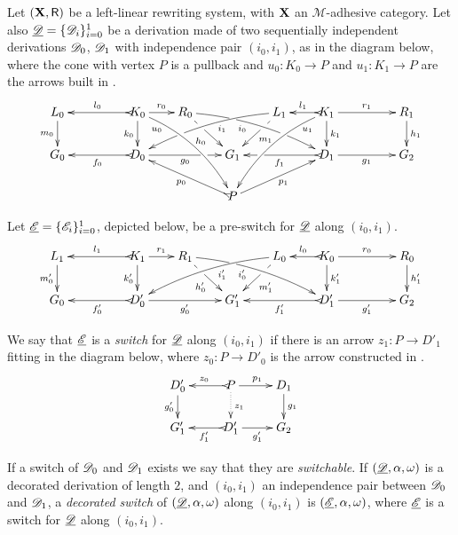 \begin{definition}[Switch] 	Let $(\textbf {\textup{X}}, \mathsf{R})$ be a left-linear rewriting system, with $\textbf {\textup{X}}$ an $\mathcal{M}$-adhesive category.
	Let also $\underline{\mathscr{D}}=\{\mathscr{D}_i\}_{i=0}^1$ be a derivation made
	of two sequentially independent derivations $\mathscr{D}_0$,
	$\mathscr{D}_1$ with independence pair $(i_0, i_1)$, as in the diagram below, where the cone with vertex $P$ is a pullback and $u_0\colon K_0\to P$ and $u_1\colon K_1\to P$ are the arrows built in .
	\[\xymatrix@R=20pt@C=20pt{L_0 \ar[d]_{m_0}&& K_0 \ar @/^.35cm/[ddrr]_(.2){u_0}
		\ar[d]_{k_0}\ar@{>->}[ll]_{l_0} \ar[r]^{r_0} & R_0
		\ar@{>}@/^.25cm/[drrr]|(.32)\hole_(.4){i_0}|(.68)\hole
		\ar[dr]|(.33)\hole_{h_0} && L_1 \ar@{>}@/_.25cm/[dlll]^(.4){i_1}|(.68)\hole 
		\ar[dl]|(.33)\hole^{m_1}& K_1 \ar[d]^{k_1}\ar@{>->}[l]_{l_1} \ar @/_.35cm/[ddll]^(.2){u_1}
		\ar[rr]^{r_1} && R_1 \ar[d]^{h_1}\\G_0 && \ar@{>->}[ll]^{f_0}
		D_0 \ar[rr]_{g_0}|(.7)\hole&& G_1 && \ar@{>->}[ll]^{f_1}|(.7)\hole D_1
		\ar[rr]_{g_1}&& G_2 \\ & & & & P \ar[urr]_{p_1} \ar@{>->}[ull]^{p_0}}
	\]
	
	Let $\underline{\mathscr{E}}=\{\mathscr{E}_i\}_{i=0}^1$, depicted below, be a pre-switch for $\underline{\mathscr{D}}$ along $(i_0,i_1)$.
	\[
	\xymatrix@R=20pt@C=20pt{
		{L_1} \ar[d]_{m_0'}
		&&  {K_1} \ar@{>->}[ll]_{l_1} \ar[r]^{r_1} \ar[d]_{k_0'}
		&  {R_1} \ar[dr]|(.33)\hole_{h_0'}  \ar@/^.25cm/@{>}_(.4){i_0'}|(.32)\hole[drrr]
		& & 
		{L_0}\ar[dl]|(.33)\hole^{m_1'} \ar@/_.25cm/@{>}^(.4){i_1'}[dlll] 
		&  {K_0} \ar@{>->}[l]_{l_0} \ar[rr]^{r_0} \ar[d]^{k_1'}
		& & {R_0} \ar[d]^{h_1'} \\		
		{G_0}
		& & {D_0'} \ar@{>->}[ll]^{f_0'} \ar[rr]_{g_0'}
		& &  {G'_1} 
		& &  {D_1'} \ar@{>->}[ll]^{f_1'} \ar[rr]_{g_1'}
		& & {G_2}  }
	\]
	
	We say that $\underline{\mathscr{E}}$ is a \emph{switch} for $\underline{\mathscr{D}}$ along $(i_0, i_1)$ if there is an arrow $z_1\colon P\to D'_1$ fitting in the diagram below, where $z_0\colon P\to D'_0$ is the arrow constructed in .
	\[\xymatrix@R=18pt{D'_0  \ar[d]_{g'_0}& P \ar[r]^{p_1} \ar@{>->}[l]_{z_0} \ar@{.>}[d]^{z_1} & D_1 \ar[d]^{g_1}\\ G'_1 & D'_1 \ar[r]_{g'_1} \ar@{>->}[l]^{f'_1} & G_2}\]
	
	If a switch of $\mathscr{D}_0$ and $\mathscr{D}_1$ exists we say that they are \emph{switchable}. If $(\underline{\mathscr{D}}, \alpha, \omega)$ is a decorated derivation of length $2$, and $(i_0, i_1)$ an independence pair between $\mathscr{D}_0$ and $\mathscr{D}_1$, a \emph{decorated switch} of $(\underline{\mathscr{D}}, \alpha, \omega)$ along $(i_0, i_1)$ is $(\underline{\mathscr{E}}, \alpha, \omega)$, where $\underline{\mathscr{E}}$ is a switch for $\underline{\mathscr{D}}$ along $(i_0, i_1)$.
\end{definition}

